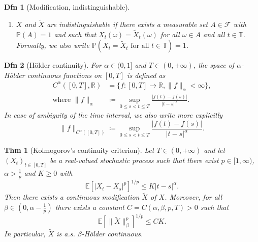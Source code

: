 \documentclass[a4paper]{article}
\theoremstyle{mytheoremstyle}
\newtheorem{definition}{Dfn}
\newtheorem{theorem}{Thm}
\newcommand{\1}{\mathds{1}}
\begin{document}
\begin{multicols*}{3}
\begin{unlabeledbox}
\begin{definition}[Modification, indistinguishable]
\begin{enumerate}[parsep=0.1pt]
      \item $X$ and $\tilde{X}$ are {\emph{indistinguishable}} if
        there exists a measurable
        set $A \in \mathcal{F}$ with $\mathbb{P} (A) = 1$ and such
        that $X_t (\omega) =
        \tilde{X}_t (\omega)$ for all $\omega \in A$ and all $t \in
        \mathbb{T}$. Formally, we
        also write $\mathbb{P} (X_t = \tilde{X}_t \text{ for all } t
        \in \mathbb{T}) = 1$.
    \end{enumerate}
  \end{definition}

  \begin{definition}[Hölder continuity]
    For $\alpha \in (0, 1]$ and $T \in (0, + \infty)$, the space of
    $\alpha$-{\emph{H{\"o}lder continuous}} functions on $[0, T]$ is defined as
    \begin{align*}
      C^{\alpha} ([0, T], \mathbb{R}) &= \{f : [0, T] \rightarrow \mathbb{R},
      \|f\|_{\alpha} < \infty\}, \\
      \text{where } \|f\|_{\alpha} &\coloneq \sup_{0 \le s < t \le T}
      \frac{|f (t) - f
      (s) |}{|t - s|^{\alpha}}.
    \end{align*}
    In case of ambiguity of the time interval, we also write more explicitly
    \vspace{-1em}
    \[
      \|f\|_{C^{\alpha} ([0, T])} \coloneq \sup_{0 \le s < t \le T}
      \frac{|f (t) - f
      (s) |}{|t - s|^{\alpha}}.
    \]
  \end{definition}

  \begin{theorem}[Kolmogorov's continuity criterion]
    \label{thm:kolmogorov-continuity}
    Let $T \in (0, + \infty)$ and let $(X_t)_{t \in [0, T]}$ be a
    real-valued stochastic
    process such that there exist $p \in [1, \infty)$, $\alpha >
    \frac{1}{p}$ and $K
    \geqslant 0$ with
    \begin{equation}\label{eq:kolmogorov continuity assumption}
      \mathbb{E} [|X_t - X_s |^p]^{1 / p} \leqslant K |t - s|^{\alpha} .
    \end{equation}
    Then there exists a continuous modification $\tilde{X}$ of $X$.
    Moreover, for all $\beta
    \in (0, \alpha - \frac{1}{p})$ there exists a constant $C = C
    (\alpha, \beta, p, T) > 0$
    such that
    \begin{equation} \label{eq:kolmogorov-continuity-conclusion}
      \mathbb{E} [\| \tilde{X} \|_{\beta}^p]^{1 / p} \leqslant C K.
    \end{equation}
    In particular, $\tilde{X}$ is a.s. $\beta$-H{\"o}lder continuous.
  \end{theorem}
\end{unlabeledbox}


\end{multicols*}
\end{document}
